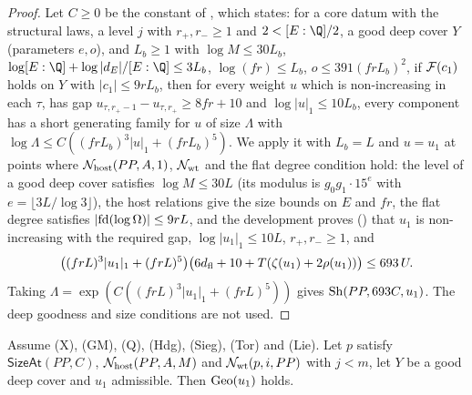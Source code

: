 \begin{proof}
Let $C\ge0$ be the constant of , which states:
for a core datum with the structural laws, a level $j$ with $r_+,r_-\ge1$ and $2<[E:\Q]/2$, a good
deep cover $Y$ (parameters $e,o$), and $L_b\ge1$ with $\log M\le30L_b$,
$\log[E:\Q]+\log|d_E|/[E:\Q]\le3L_b$, $\log(fr)\le L_b$, $o\le391(frL_b)^2$, if $\mathcal F(c_1)$ holds on $Y$ with
$|c_1|\le9rL_b$, then for every weight $u$ which is non-increasing in each $\tau$, has gap
$u_{\tau,r_+-1}-u_{\tau,r_+}\ge8fr+10$ and $\log|u|_1\le10L_b$, every component has a short generating
family for $u$ of size $\Lambda$ with $\log\Lambda\le C((frL_b)^3|u|_1+(frL_b)^5)$. We apply it with
$L_b=L$ and $u=u_1$ at points where $\mathcal N_{\mathrm{host}}(PP,A,1)$, $\mathcal N_{\mathrm{wt}}$ and the flat degree
condition hold: the level of a good deep cover satisfies $\log M\le30L$ (its modulus is
$g_0g_1\cdot15^{e}$ with $e=\lfloor3L/\log3\rfloor$), the host relations give the size bounds on $E$
and $fr$, the flat degree satisfies $|\mathrm{fd}(\log\Omega)|\le9rL$, and the development proves
() that $u_1$ is non-increasing with the required gap,
$\log|u_1|_1\le10L$, $r_+,r_-\ge1$, and
\[
\bigl((frL)^3|u_1|_1+(frL)^5\bigr)\bigl(6d_{\mathrm{fl}}+10+T(\zeta(u_1)+2\rho(u_1))\bigr)\le693\,U .
\]
Taking $\Lambda=\exp(C((frL)^3|u_1|_1+(frL)^5))$ gives $\mathrm{Sh}(PP,693C,u_1)$. The deep goodness
and size conditions are not used.
\end{proof}

\begin{lemma}\label{pf:lift1:geom}
Assume (X), (GM), (Q), (Hdg), (Sieg), (Tor) and (Lie). Let $p$ satisfy $\mathsf{SizeAt}(PP,C)$,
$\mathcal N_{\mathrm{host}}(PP,A,M)$ and $\mathcal N_{\mathrm{wt}}(p,i,PP)$ with $j<m$, let $Y$ be a good deep cover and $u_1$
admissible. Then $\mathrm{Geo}(u_1)$ holds.
\end{lemma}

